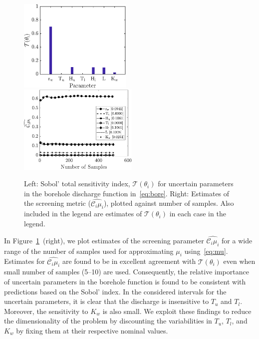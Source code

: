 \begin{figure}[htbp]
 \begin{center}
  \includegraphics[width=0.48\textwidth]{./Figures/sense_borehole}
  \includegraphics[width=0.51\textwidth]{./Figures/ub_conv_borehole}
\caption{
Left: Sobol' total sensitivity index, $\mathcal{T}(\theta_i)$ for uncertain
parameters in the
borehole discharge function in~\eqref{eq:bore}. Right: 
Estimates of the screening metric ($\widehat{\mathcal{C}_i\mu_i}$), plotted
against number of samples. Also included in the legend are estimates of
$\mathcal{T}(\theta_i)$ in each case in the legend.}
\label{fig:sense_bore}
\end{center}
\end{figure}

In Figure~\ref{fig:sense_bore}~(right), we plot estimates of the screening parameter 
$\widehat{\mathcal{C}_i\mu_i}$ for a wide range of the number of 
samples used for approximating $\mu_i$ using~\eqref{eq:mu}.
Estimates for $\widehat{\mathcal{C}_i\mu_i}$ are found to be in excellent agreement
with $\mathcal{T}(\theta_i)$ even when small number of samples (5--10) are used. 
Consequently, the relative importance of uncertain 
parameters in the borehole function is found to be consistent 
with predictions based on the Sobol' index. 
In the considered intervals for the uncertain parameters, it is clear 
that the discharge is insensitive to $T_u$ and $T_l$. 
Moreover, the sensitivity to $K_w$ is also small. We exploit these findings to reduce
the dimensionality of the problem by 
discounting the variabilities in $T_u$, $T_l$, and $K_w$ by fixing 
them at their respective nominal values. 

